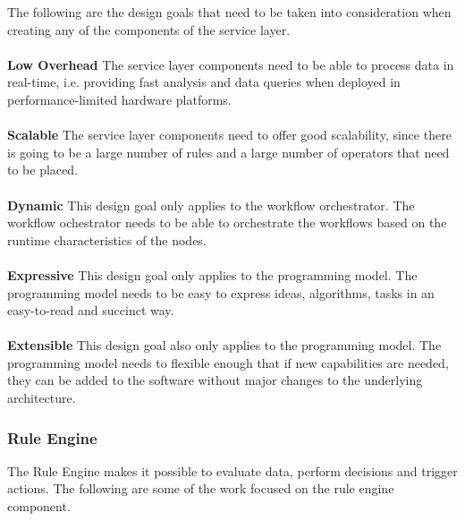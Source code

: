 The following are the design goals that need to be taken into consideration when creating any of the components of the service layer.
\\\\
\textbf{Low Overhead} The service layer components need to be able to process data in real-time, i.e. providing fast analysis and data queries when deployed in performance-limited hardware platforms.
\\\\
\textbf{Scalable} The service layer components need to offer good scalability, since there is going to be a large number of rules and a large number of operators that need to be placed.
\\\\
\textbf{Dynamic} This design goal only applies to the workflow orchestrator. The workflow ochestrator needs to be able to orchestrate the workflows based on the runtime characteristics of the nodes. 
\\\\
\textbf{Expressive} This design goal only applies to the programming model. The programming model needs to be easy to express ideas, algorithms, tasks in an easy-to-read and succinct way.
\\\\
\textbf{Extensible} This design goal also only applies to the programming model. The programming model needs to flexible enough that if new capabilities are needed, they can be added to the software without major changes to the underlying architecture.


\subsubsection{Rule Engine}

The Rule Engine makes it possible to evaluate data, perform decisions and trigger actions. The following are some of the work focused on the rule engine component.

